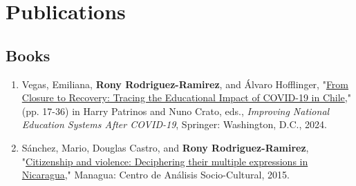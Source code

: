 \documentclass[a4paper,10pt]{article}
\renewenvironment{itemize}{
  \begin{list}{}
    { \setlength{\itemsep}{5pt}
      \setlength{\parsep}{0pt}
      \setlength{\topsep}{0pt}
      \setlength{\leftmargin}{0em} } }{
  \end{list}}
\begin{document}





\section*{Publications}

\subsection*{Books}

\begin{enumerate}[leftmargin=10pt, label={}, itemindent=-10pt, nosep]
\item Vegas, Emiliana, \textbf{Rony Rodriguez-Ramirez}, and Álvaro Hofflinger, "\href{https://link.springer.com/book/10.1007/978-3-031-69284-0}{From
Closure to Recovery: Tracing the Educational Impact of COVID-19 in Chile}," (pp.
17-36) in Harry Patrinos and Nuno Crato, eds., \textit{Improving National Education Systems After COVID-19}, Springer: Washington, D.C., 2024.
\item Sánchez, Mario, Douglas Castro, and \textbf{Rony Rodriguez-Ramirez},
"\href{http://biblioteca.clacso.edu.ar/Nicaragua/casc-uca/20150313124733/Ciudadania-y-violencia.pdf}{Citizenship
and violence: Deciphering their multiple expressions in Nicaragua}," Managua:
Centro de Análisis Socio-Cultural, 2015. 
\end{enumerate}
\end{document}
